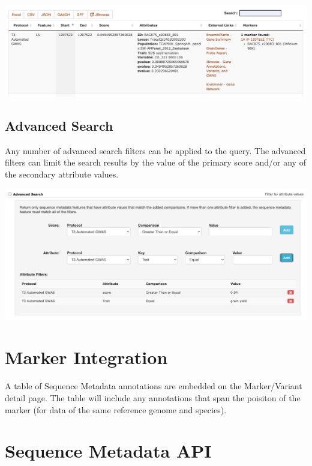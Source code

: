\documentclass[
  12pt,
]{book}
\begin{document}
\begin{center}\includegraphics[width=0.95\linewidth]{assets/images/sequence_metadata_search_results} \end{center}

\hypertarget{advanced-search}{%
\subsection{Advanced Search}\label{advanced-search}}

Any number of advanced search filters can be applied to the query. The advanced filters can limit the search results by the value of the primary score and/or any of the secondary attribute values.

\begin{center}\includegraphics[width=0.95\linewidth]{assets/images/sequence_metadata_search_advanced} \end{center}

\hypertarget{marker-integration}{%
\section{Marker Integration}\label{marker-integration}}

A table of Sequence Metadata annotations are embedded on the Marker/Variant detail page. The table will include any annotations that span the poisiton of the marker (for data of the same reference genome and species).

\hypertarget{sequence-metadata-api}{%
\section{Sequence Metadata API}\label{sequence-metadata-api}}
\end{document}
